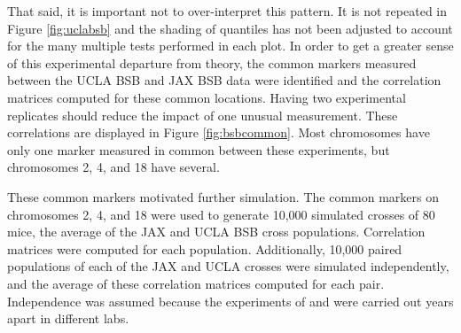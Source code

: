 \documentclass[12pt]{article}
\begin{document}
That said, it is important not to over-interpret this pattern. It is not repeated in Figure \ref{fig:uclabsb} and the shading of quantiles has not been adjusted to account for the many multiple tests performed in each plot. In order to get a greater sense of this experimental departure from theory, the common markers measured between the UCLA BSB and JAX BSB data were identified and the correlation matrices computed for these common locations. Having two experimental replicates should reduce the impact of one unusual measurement. These correlations are displayed in Figure \ref{fig:bsbcommon}. Most chromosomes have only one marker measured in common between these experiments, but chromosomes 2, 4, and 18 have several.

These common markers motivated further simulation. The common markers on chromosomes 2, 4, and 18 were used to generate 10,000 simulated crosses of 80 mice, the average of the JAX and UCLA BSB cross populations. Correlation matrices were computed for each population. Additionally, 10,000 paired populations of each of the JAX and UCLA crosses were simulated independently, and the average of these correlation matrices computed for each pair. Independence was assumed because the experiments of \cite{roweetal1994jaxbsb} and \cite{welchetal1996uclabsb} were carried out years apart in different labs.
\end{document}
